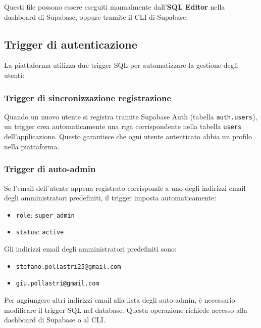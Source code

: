\documentclass[a4paper,11pt,oneside]{book}
\newcommand{\campo}[1]{\texttt{#1}}
\newcommand{\email}[1]{\texttt{#1}}
\begin{document}
Questi file possono essere eseguiti manualmente dall'\textbf{SQL Editor} nella dashboard di Supabase, oppure tramite il CLI di Supabase.

\subsection{Trigger di autenticazione}
\label{sec:supabase-trigger}

La piattaforma utilizza due trigger SQL per automatizzare la gestione degli utenti:

\subsubsection{Trigger di sincronizzazione registrazione}

Quando un nuovo utente si registra tramite Supabase Auth (tabella \texttt{auth.users}), un trigger crea automaticamente una riga corrispondente nella tabella \texttt{users} dell'applicazione. Questo garantisce che ogni utente autenticato abbia un profilo nella piattaforma.

\subsubsection{Trigger di auto-admin}

Se l'email dell'utente appena registrato corrisponde a uno degli indirizzi email degli amministratori predefiniti, il trigger imposta automaticamente:

\begin{itemize}[leftmargin=1.5em]
  \item \campo{role}: \texttt{super\_admin}
  \item \campo{status}: \texttt{active}
\end{itemize}

Gli indirizzi email degli amministratori predefiniti sono:
\begin{itemize}[leftmargin=1.5em]
  \item \email{stefano.pollastri25@gmail.com}
  \item \email{giu.pollastri@gmail.com}
\end{itemize}

\begin{infobox}
Per aggiungere altri indirizzi email alla lista degli auto-admin, \`e necessario modificare il trigger SQL nel database. Questa operazione richiede accesso alla dashboard di Supabase o al CLI.
\end{infobox}
\end{document}
